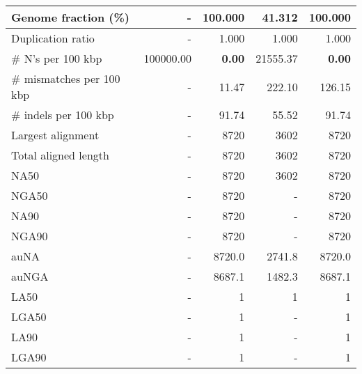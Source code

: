 \documentclass[12pt,a4paper]{article}
\begin{document}
\begin{table}[ht]
\begin{center}
\begin{tabular}{|l*{4}{|r}|}
Genome fraction (\%) & - & 100.000 & 41.312 & 100.000 \\ \hline
Duplication ratio & - & 1.000 & 1.000 & 1.000 \\ \hline
\# N's per 100 kbp & 100000.00 & {\bf 0.00} & 21555.37 & {\bf 0.00} \\ \hline
\# mismatches per 100 kbp & - & 11.47 & 222.10 & 126.15 \\ \hline
\# indels per 100 kbp & - & 91.74 & 55.52 & 91.74 \\ \hline
Largest alignment & - & 8720 & 3602 & 8720 \\ \hline
Total aligned length & - & 8720 & 3602 & 8720 \\ \hline
NA50 & - & 8720 & 3602 & 8720 \\ \hline
NGA50 & - & 8720 & - & 8720 \\ \hline
NA90 & - & 8720 & - & 8720 \\ \hline
NGA90 & - & 8720 & - & 8720 \\ \hline
auNA & - & 8720.0 & 2741.8 & 8720.0 \\ \hline
auNGA & - & 8687.1 & 1482.3 & 8687.1 \\ \hline
LA50 & - & 1 & 1 & 1 \\ \hline
LGA50 & - & 1 & - & 1 \\ \hline
LA90 & - & 1 & - & 1 \\ \hline
LGA90 & - & 1 & - & 1 \\ \hline
\end{tabular}
\end{center}
\end{table}
\end{document}
